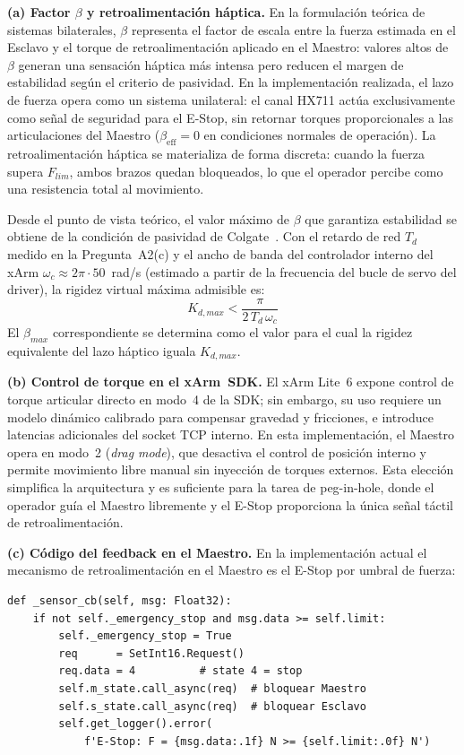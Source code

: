 \documentclass[journal,10pt,twoside]{IEEEtran}
\begin{document}
\textbf{(a) Factor $\beta$ y retroalimentación háptica.}
En la formulación teórica de sistemas bilaterales, $\beta$ representa
el factor de escala entre la fuerza estimada en el Esclavo y el
torque de retroalimentación aplicado en el Maestro: valores altos
de $\beta$ generan una sensación háptica más intensa pero reducen
el margen de estabilidad según el criterio de pasividad. En la
implementación realizada, el lazo de fuerza opera como un sistema
unilateral: el canal HX711 actúa exclusivamente como señal de
seguridad para el E-Stop, sin retornar torques proporcionales a
las articulaciones del Maestro ($\beta_{\text{eff}}{=}0$ en
condiciones normales de operación). La retroalimentación háptica
se materializa de forma discreta: cuando la fuerza supera
$F_{lim}$, ambos brazos quedan bloqueados, lo que el operador
percibe como una resistencia total al movimiento.

Desde el punto de vista teórico, el valor máximo de $\beta$ que
garantiza estabilidad se obtiene de la condición de pasividad de
Colgate~\cite{colgate1993}. Con el retardo de red $T_d$ medido en
la Pregunta~A2(c) y el ancho de banda del controlador interno del
xArm $\omega_c \approx 2\pi\cdot 50$~rad/s (estimado a partir de
la frecuencia del bucle de servo del driver), la rigidez virtual
máxima admisible es:
\[
  K_{d,max} < \frac{\pi}{2\,T_d\,\omega_c}
\]
El $\beta_{max}$ correspondiente se determina como el valor para
el cual la rigidez equivalente del lazo háptico iguala $K_{d,max}$.

\textbf{(b) Control de torque en el xArm~SDK.}
El xArm Lite~6 expone control de torque articular directo en
modo~4 de la SDK; sin embargo, su uso requiere un modelo dinámico
calibrado para compensar gravedad y fricciones, e introduce
latencias adicionales del socket TCP interno. En esta
implementación, el Maestro opera en modo~2 (\textit{drag mode}),
que desactiva el control de posición interno y permite movimiento
libre manual sin inyección de torques externos. Esta elección
simplifica la arquitectura y es suficiente para la tarea de
peg-in-hole, donde el operador guía el Maestro libremente y el
E-Stop proporciona la única señal táctil de retroalimentación.

\textbf{(c) Código del feedback en el Maestro.}
En la implementación actual el mecanismo de retroalimentación
en el Maestro es el E-Stop por umbral de fuerza:

\begin{lstlisting}[caption={Callback del sensor -- E-Stop como feedback haptico en el Maestro},
                   label={lst:estop}]
def _sensor_cb(self, msg: Float32):
    if not self._emergency_stop and msg.data >= self.limit:
        self._emergency_stop = True
        req      = SetInt16.Request()
        req.data = 4          # state 4 = stop
        self.m_state.call_async(req)  # bloquear Maestro
        self.s_state.call_async(req)  # bloquear Esclavo
        self.get_logger().error(
            f'E-Stop: F = {msg.data:.1f} N >= {self.limit:.0f} N')
\end{lstlisting}
\end{document}
